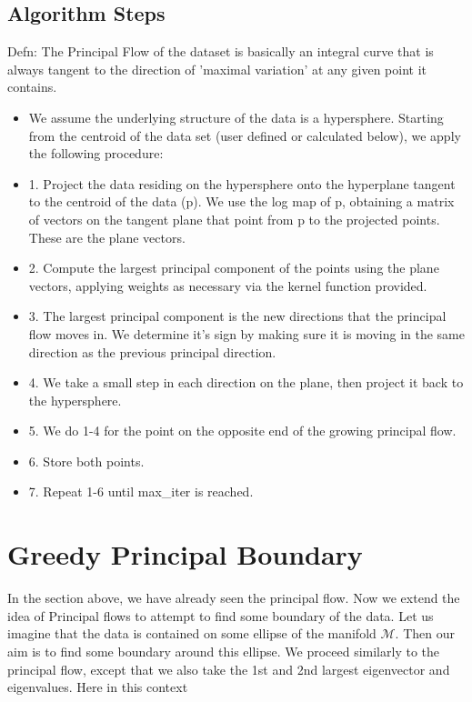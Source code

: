 \documentclass[12pt]{report}
\begin{document}
\section{Algorithm Steps}
Defn: The Principal Flow of the dataset is basically an integral curve 
that is always tangent to the direction of 'maximal variation' at any given point 
it contains.
\begin{itemize}
    \item We assume the underlying structure of the data is a hypersphere.
    Starting from the centroid of the data set (user defined or calculated below), we apply the following procedure: 
    \item 1. Project the data residing on the hypersphere onto the hyperplane
    tangent to the centroid of the data (p). We use the log map of p, 
    obtaining a matrix of vectors on the tangent plane that point from p
    to the projected points. These are the plane vectors.

    \item 2. Compute the largest principal component of the points 
    using the plane vectors, applying weights as necessary via the kernel function provided.

    \item 3. The largest principal component is the new directions 
    that the principal flow moves in. We determine it's sign by making sure
     it is moving in the same direction as the previous principal direction.

    \item 4. We take a small step in each direction on the plane,
    then project it back to the hypersphere.

    \item 5. We do 1-4 for the point on the opposite end of the growing principal flow.

    \item 6. Store both points. 
    
    \item 7. Repeat 1-6 until max\_iter is reached.
\end{itemize}

\chapter{Greedy Principal Boundary}

In the section above, we have already seen the principal flow.
Now we extend the idea of Principal flows to attempt to find some boundary of the data.
Let us imagine that the data is contained on some ellipse of the manifold
$\mathcal{M}$. Then our aim is to find some boundary around this ellipse. We proceed 
similarly to the principal flow, except that we also take the 1st and 2nd largest eigenvector
and eigenvalues. Here in this context
\end{document}
